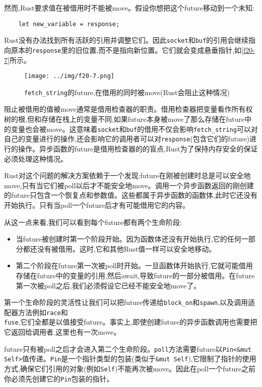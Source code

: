 然而,Rust要求值在被借用时不能被move。假设你想把这个future移动到一个未知:
\begin{verbatim}
    let new_variable = response;
\end{verbatim}

Rust没有办法找到所有活跃的引用并调整它们。因此\texttt{socket}和\texttt{buf}的引用会继续指向原本的\texttt{response}里的旧位置,而不是指向新位置。它们就会变成悬垂指针,如\autoref{f20-7}所示。

\begin{figure}
    \centering
    \texttt{[image: ../img/f20-7.png]}
    \caption{\texttt{fetch\_string}的future,在借用的同时被move(Rust会阻止这种情况)}
    \label{f20-7}
\end{figure}

阻止被借用的值被move通常是借用检查器的职责。借用检查器把变量看作所有权树的根,但和存储在栈上的变量不同,如果future本身被move了那么存储在future中的变量也会被move。这意味着\texttt{socket}和\texttt{buf}的借用不仅会影响\texttt{fetch\_string}可以对自己的变量进行的操作,还会影响它的调用者可以对\texttt{response}(包含它们的future)进行的操作。异步函数的future是借用检查器的的盲点,Rust为了保持内存安全的保证必须处理这种情况。

Rust对这个问题的解决方案依赖于一个发现:future在刚被创建时总是可以安全地move,只有当它们被poll以后才不能安全地move。调用一个异步函数返回的刚创建的future只包含一个恢复点和参数值。这些都属于异步函数的函数体,此时它还没有开始执行。只有当poll一个future后才有可能借用它的内容。

从这一点来看,我们可以看到每个future都有两个生命阶段:
\begin{itemize}
    \item 当future被创建时第一个阶段开始。因为函数体还没有开始执行,它的任何一部分都还没有被借用。这时,它和其他Rust值一样可以安全地移动。
    \item 第二个阶段在future第一次被poll时开始。一旦函数体开始执行,它就可能借用存储在future中的变量的引用,然后await,导致future的一部分被借用。在future第一次被poll之后,我们必须假设它已经不能安全地move了。
\end{itemize}

第一个生命阶段的灵活性让我们可以把future传递给\texttt{block\_on}和\texttt{spawn},以及调用适配器方法例如\texttt{race}和\\
\texttt{fuse},它们全都是以值接受future。事实上,即使创建future的异步函数调用也需要把它返回给调用者,这里也有一次move。

future只有被poll之后才会进入第二个生命阶段。\texttt{poll}方法需要future以\texttt{Pin<\&mut Self>}值传递。\texttt{Pin}是一个指针类型的包装(类似于\texttt{\&mut Self}),它限制了指针的使用方式,确保它们引用的对象(例如\texttt{Self})不能再次被move。因此在poll一个future之前你必须先创建它的\texttt{Pin}包装的指针。

